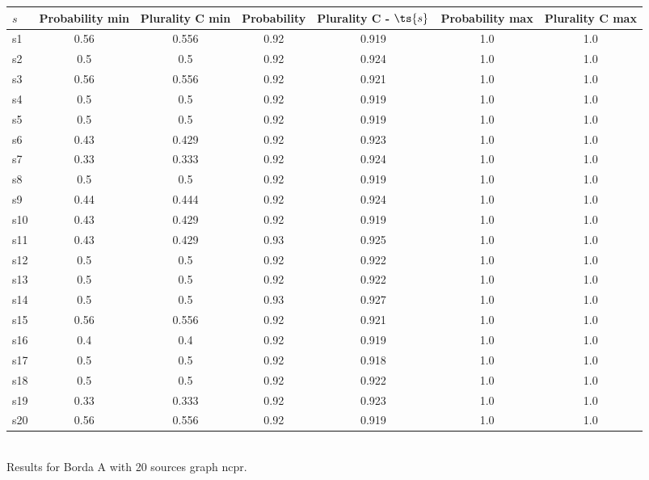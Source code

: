 \documentclass{article}
\begin{document}
\noindent\begin{tabular}{|l|c|c|c|c|c|c|}
\hline
$s$& Probability min & Plurality C min & Probability & Plurality C - $\ts{s}$ & Probability max & Plurality C max\\
\hline
s1 &0.56 & 0.556 & 0.92 & 0.919 & 1.0 & 1.0\\
\hline
s2 &0.5 & 0.5 & 0.92 & 0.924 & 1.0 & 1.0\\
\hline
s3 &0.56 & 0.556 & 0.92 & 0.921 & 1.0 & 1.0\\
\hline
s4 &0.5 & 0.5 & 0.92 & 0.919 & 1.0 & 1.0\\
\hline
s5 &0.5 & 0.5 & 0.92 & 0.919 & 1.0 & 1.0\\
\hline
s6 &0.43 & 0.429 & 0.92 & 0.923 & 1.0 & 1.0\\
\hline
s7 &0.33 & 0.333 & 0.92 & 0.924 & 1.0 & 1.0\\
\hline
s8 &0.5 & 0.5 & 0.92 & 0.919 & 1.0 & 1.0\\
\hline
s9 &0.44 & 0.444 & 0.92 & 0.924 & 1.0 & 1.0\\
\hline
s10 &0.43 & 0.429 & 0.92 & 0.919 & 1.0 & 1.0\\
\hline
s11 &0.43 & 0.429 & 0.93 & 0.925 & 1.0 & 1.0\\
\hline
s12 &0.5 & 0.5 & 0.92 & 0.922 & 1.0 & 1.0\\
\hline
s13 &0.5 & 0.5 & 0.92 & 0.922 & 1.0 & 1.0\\
\hline
s14 &0.5 & 0.5 & 0.93 & 0.927 & 1.0 & 1.0\\
\hline
s15 &0.56 & 0.556 & 0.92 & 0.921 & 1.0 & 1.0\\
\hline
s16 &0.4 & 0.4 & 0.92 & 0.919 & 1.0 & 1.0\\
\hline
s17 &0.5 & 0.5 & 0.92 & 0.918 & 1.0 & 1.0\\
\hline
s18 &0.5 & 0.5 & 0.92 & 0.922 & 1.0 & 1.0\\
\hline
s19 &0.33 & 0.333 & 0.92 & 0.923 & 1.0 & 1.0\\
\hline
s20 &0.56 & 0.556 & 0.92 & 0.919 & 1.0 & 1.0\\
\hline
\end{tabular}\\

\noindent Results for Borda A with 20 sources graph ncpr.
\end{document}
